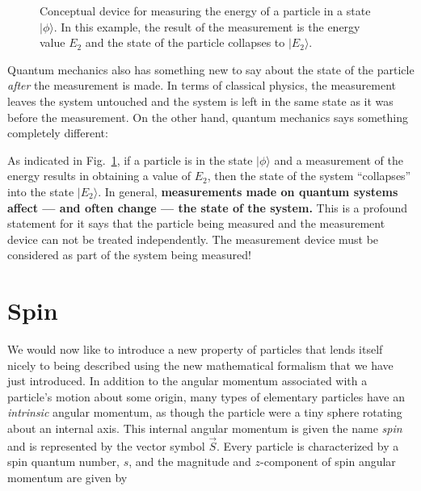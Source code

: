 \begin{figure}
\begin{center}
\caption{Conceptual device for measuring the energy of a particle in a state $|\mbox{$\phi$}\rangle$. In this example, the result of the measurement is the energy value $E_2$ and the state of the particle collapses to $|\mbox{$E_2$}\rangle$.}
\label{fig:Measurement}
\end{center}
\end{figure}

Quantum mechanics also has something new to say about the state of the
particle \emph{after} the measurement is made.  In terms of classical
physics, the measurement leaves the system untouched and the system is
left in the same state as it was before the measurement.  On the other
hand, quantum mechanics says something completely different:



As indicated in Fig.~\ref{fig:Measurement}, if a particle is in
the state $|\mbox{$\phi$}\rangle$ and a measurement of the energy
results in obtaining a value of $E_2$, then the state of the system
``collapses'' into the state $|\mbox{$E_2$}\rangle$.  In general, {\bf
measurements made on quantum systems affect --- and often change --- the
state of the system.}  This is a profound statement for it says that the
particle being measured and the measurement device can not be treated
independently. The measurement device must be considered as part of the
system being measured!

\section{Spin}
\label{sec:quantum_spin}

We would now like to introduce a new property of particles that lends
itself nicely to being described using the new mathematical formalism
that we have just introduced.  In addition to the angular momentum
associated with a particle's motion about some origin, many types
of elementary particles have an \textit{intrinsic} angular momentum,
as though the particle were a tiny sphere rotating about an internal
axis.  This internal angular momentum is given the name {\it spin\/}
and is represented by the vector symbol $\vec{S}$.  Every particle is
characterized by a spin quantum number, $s$, and 
the magnitude and $z$-component of spin angular momentum are given by

